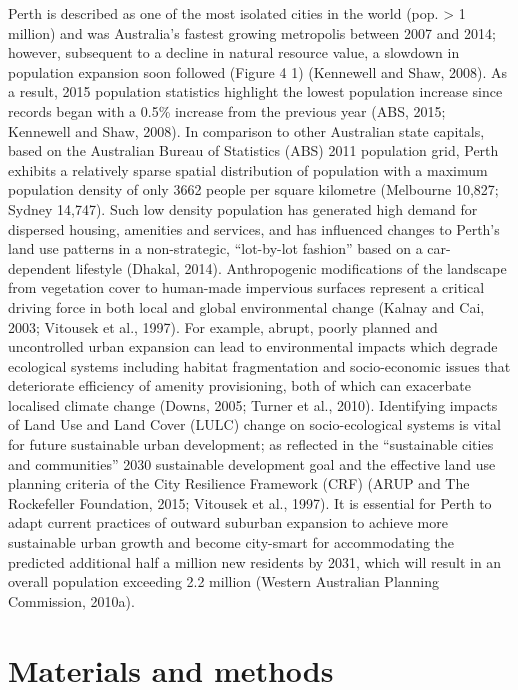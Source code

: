 \documentclass[]{book}
\begin{document}
Perth is described as one of the most isolated cities in the world (pop.
\textgreater{} 1 million) and was Australia's fastest growing metropolis
between 2007 and 2014; however, subsequent to a decline in natural
resource value, a slowdown in population expansion soon followed (Figure
4 1) (Kennewell and Shaw, 2008). As a result, 2015 population statistics
highlight the lowest population increase since records began with a
0.5\% increase from the previous year (ABS, 2015; Kennewell and Shaw,
2008). In comparison to other Australian state capitals, based on the
Australian Bureau of Statistics (ABS) 2011 population grid, Perth
exhibits a relatively sparse spatial distribution of population with a
maximum population density of only 3662 people per square kilometre
(Melbourne 10,827; Sydney 14,747). Such low density population has
generated high demand for dispersed housing, amenities and services, and
has influenced changes to Perth's land use patterns in a non-strategic,
``lot-by-lot fashion'' based on a car-dependent lifestyle (Dhakal,
2014). Anthropogenic modifications of the landscape from vegetation
cover to human-made impervious surfaces represent a critical driving
force in both local and global environmental change (Kalnay and Cai,
2003; Vitousek et al., 1997). For example, abrupt, poorly planned and
uncontrolled urban expansion can lead to environmental impacts which
degrade ecological systems including habitat fragmentation and
socio-economic issues that deteriorate efficiency of amenity
provisioning, both of which can exacerbate localised climate change
(Downs, 2005; Turner et al., 2010). Identifying impacts of Land Use and
Land Cover (LULC) change on socio-ecological systems is vital for future
sustainable urban development; as reflected in the ``sustainable cities
and communities'' 2030 sustainable development goal and the effective
land use planning criteria of the City Resilience Framework (CRF) (ARUP
and The Rockefeller Foundation, 2015; Vitousek et al., 1997). It is
essential for Perth to adapt current practices of outward suburban
expansion to achieve more sustainable urban growth and become city-smart
for accommodating the predicted additional half a million new residents
by 2031, which will result in an overall population exceeding 2.2
million (Western Australian Planning Commission, 2010a).

\section{Materials and methods}\label{materials-and-methods}
\end{document}
